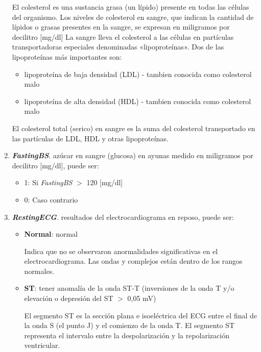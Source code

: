 \documentclass[12pt, letterpaper]{article}
\begin{document}
\begin{enumerate}
{    El colesterol es una sustancia grasa (un lípido) presente en todas las células del organismo.
    Los niveles de colesterol en sangre, que indican la cantidad de lípidos o grasas presentes
    en la sangre, se expresan en miligramos por decilitro [mg/dl]
    La sangre lleva el colesterol a las células en partículas transportadoras especiales 
    denominadas «lipoproteínas». Dos de las lipoproteínas más importantes son:
    \begin{itemize}
        \item{lipoproteína de baja densidad (LDL) - tambien conocida como colesterol malo}
        \item{lipoproteína de alta densidad (HDL) - tambien conocida como colesterol malo}
    \end{itemize}

    El colesterol total (serico) en sangre es la suma del colesterol transportado en las 
    partículas de LDL, HDL y otras lipoproteínas. \cite{colesterol}
    }
    \item{\textbf{\textit{FastingBS}}. azúcar en sangre (glucosa) en ayunas
    medido en miligramos por decilitro [mg/dl], puede ser:
    \begin{itemize}
        \item{1: Si \textit{FastingBS} \(>\) 120 [mg/dl]}
        \item{0: Caso contrario}
    \end{itemize}
    }
    \item{\textbf{\textit{RestingECG}}. resultados del electrocardiograma 
    en reposo, puede ser:
    \begin{itemize}
        \item{\textbf{Normal}: normal
        
        Indica que no se observaron anormalidades significativas en el electrocardiograma. 
        Las ondas y complejos están dentro de los rangos normales.
        }
        \item{\textbf{ST}: tener anomalía de la onda ST-T 
        (inversiones de la onda T y/o elevación o depresión del ST \(>\) 0,05 mV)

        El segmento ST es la sección plana e isoeléctrica 
        del ECG entre el final de la onda S (el punto J) y el comienzo de la onda T.
        El segmento ST representa el intervalo entre la despolarización y la repolarización 
        ventricular. \cite{ST}


}
\end{itemize}}
\end{enumerate}
\end{document}
